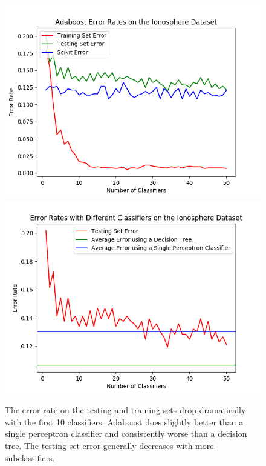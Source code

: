 \documentclass{article}
\begin{document}
\begin{figure}[hbt]
\centering
\includegraphics[scale=0.7]{Ionosphere_1}
\includegraphics[scale=0.7]{Ionosphere_different_classifiers_1} 
\caption{The error rate on the testing and training sets drop dramatically with the first 10 classifiers. Adaboost does slightly better than a single perceptron classifier and consistently worse than a decision tree. The testing set error generally decreases with more subclassifiers.}
\end{figure}
\end{document}
